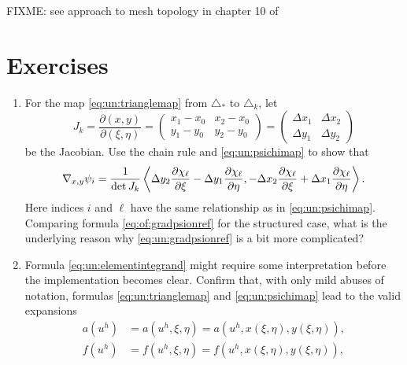 FIXME: see approach to mesh topology in chapter 10 of \citep{Loggetal2012}


\section{Exercises}

\renewcommand{\labelenumi}{\arabic{chapter}.\arabic{enumi}\quad}
\renewcommand{\labelenumii}{(\alph{enumii})}
\begin{enumerate}
\item  \label{exer:un:gradientdetails}  For the map \eqref{eq:un:trianglemap} from $\triangle_\ast$ to $\triangle_k$, let
    $$J_k = \frac{\partial (x,y)}{\partial (\xi,\eta)} = \begin{pmatrix}
    x_1 - x_0 & x_2 - x_0 \\
    y_1 - y_0 & y_2 - y_0 \end{pmatrix}
    = \begin{pmatrix}
    \Delta x_1 & \Delta x_2 \\
    \Delta y_1 & \Delta y_2
    \end{pmatrix}$$
be the Jacobian.  Use the chain rule and \eqref{eq:un:psichimap} to show that
\begin{equation}
\nabla_{x,y} \psi_i = \frac{1}{\det J_k} \left<\Delta y_2 \frac{\partial \chi_\ell}{\partial \xi} - \Delta y_1 \frac{\partial \chi_\ell}{\partial \eta}, - \Delta x_2 \frac{\partial \chi_\ell}{\partial \xi} + \Delta x_1 \frac{\partial \chi_\ell}{\partial \eta}\right>. \label{eq:un:gradpsionref}
\end{equation}
Here indices $i$ and $\ell$ have the same relationship as in \eqref{eq:un:psichimap}.  Comparing formula \eqref{eq:of:gradpsionref} for the structured case, what is the underlying reason why \eqref{eq:un:gradpsionref} is a bit more complicated?  %
\item  \label{exer:un:elementintegranddetails}  Formula \eqref{eq:un:elementintegrand} might require some interpretation before the implementation becomes clear.  Confirm that, with only mild abuses of notation, formulas \eqref{eq:un:trianglemap} and \eqref{eq:un:psichimap} lead to the valid expansions
\begin{align*}
a(u^h) &= a(u^h,\xi,\eta) = a(u^h,x(\xi,\eta),y(\xi,\eta)), \\
f(u^h) &= f(u^h,\xi,\eta) = f(u^h,x(\xi,\eta),y(\xi,\eta)), \\

\end{align*}
\end{enumerate}
